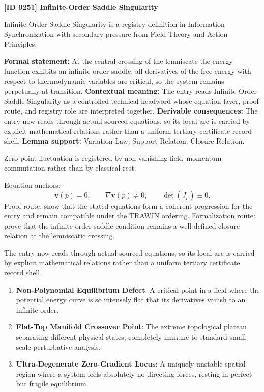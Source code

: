 \clearpage
\noindent\textbf{[ID 0251] Infinite-Order Saddle Singularity}\par
\vspace{0.35em}
\begingroup\small
{}
Infinite-Order Saddle Singularity is a registry definition in Information Synchronization with secondary pressure from Field Theory and Action Principles.

\begingroup\footnotesize\setlength{\emergencystretch}{3em}\sloppy
\textbf{Formal statement:} At the central crossing of the lemniscate the energy function exhibits an infinite-order saddle: all derivatives of the free energy with respect to thermodynamic variables are critical, so the system remains perpetually at transition. \textbf{Contextual meaning:} The entry reads Infinite-Order Saddle Singularity as a controlled technical headword whose equation layer, proof route, and registry role are interpreted together. \textbf{Derivable consequences:} The entry now reads through actual sourced equations, so its local arc is carried by explicit mathematical relations rather than a uniform tertiary certificate record shell. \textbf{Lemma support:} Variation Law; Support Relation; Closure Relation.\par
\endgroup

Zero-point fluctuation is registered by non-vanishing field--momentum commutation rather than by classical rest.

Equation anchors:
\[
\mathbf{v}(p)=0,\qquad
\nabla\mathbf{v}(p)\neq0,\qquad
\det(J_p)\equiv0.
\]
Proof route: show that the stated equations form a coherent progression for the entry and remain compatible under the TRAWIN ordering. Formalization route: prove that the infinite-order saddle condition remains a well-defined closure relation at the lemniscatic crossing.

The entry now reads through actual sourced equations, so its local arc is carried by explicit mathematical relations rather than a uniform tertiary certificate record shell.
\endgroup

\begin{enumerate}[leftmargin=1.6em,itemsep=6pt,topsep=4pt]
\item \textbf{Non-Polynomial Equilibrium Defect}: A critical point in a field where the potential energy curve is so intensely flat that its derivatives vanish to an infinite order.
\item \textbf{Flat-Top Manifold Crossover Point}: The extreme topological plateau separating different physical states, completely immune to standard small-scale perturbative analysis.
\item \textbf{Ultra-Degenerate Zero-Gradient Locus}: A uniquely unstable spatial region where a system feels absolutely no directing forces, resting in perfect but fragile equilibrium.
\end{enumerate}

